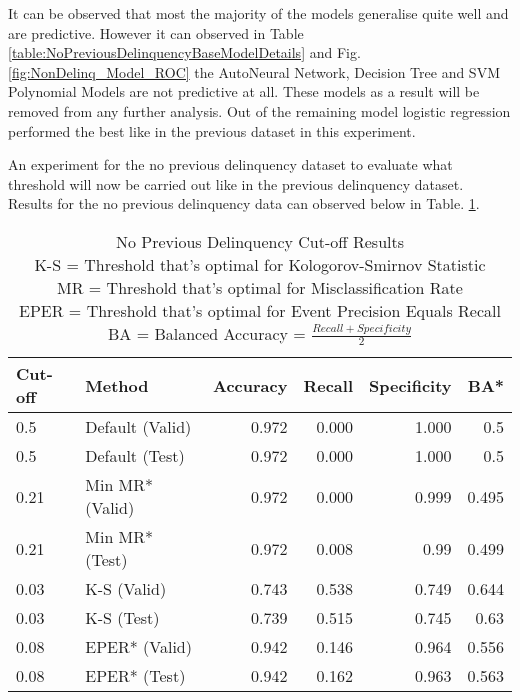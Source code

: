 It can be observed that most the majority of the models generalise quite well and are predictive. However it can observed in Table \ref{table:NoPreviousDelinquencyBaseModelDetails} and Fig. \ref{fig:NonDelinq_Model_ROC} the AutoNeural Network, Decision Tree and SVM Polynomial Models are not predictive at all. These models as a result will be removed from any further analysis. Out of the remaining model logistic regression performed the best like in the previous dataset in this experiment. 

An experiment for the no previous delinquency dataset to evaluate what threshold will now be carried out like in the previous delinquency dataset. Results for the no previous delinquency data can observed below in Table. \ref{table:NoDelinquencyModelCutoff}.

\begin{table}[H]
	\centering
	\small
		\begin{tabular}{|l|l|r|r|r|r|}
			\hline
			\textbf{Cut-off} & \textbf{Method} & \textbf{Accuracy} & \textbf{Recall} & \textbf{Specificity}  & \textbf{BA*}  \\ \hline
			0.5             & Default (Valid)  & 0.972             & 0.000           & 1.000                  & 0.5     \\
			0.5             & Default (Test)   & 0.972             & 0.000           & 1.000                  & 0.5     \\ \hline
			
			0.21            & Min MR* (Valid)   & 0.972             & 0.000           & 0.999                    & 0.495   \\
			0.21            & Min MR* (Test)    & \cellcolor{yellow!25}0.972             & 0.008                         & \cellcolor{yellow!25}0.99  & 0.499     \\ \hline
			
			0.03            & K-S (Valid)      & 0.743             & 0.538           & 0.749                 & 0.644     \\
			0.03            & K-S (Test)       & 0.739             & \cellcolor{yellow!25}0.515                          & 0.745  & \cellcolor{yellow!25}0.63     \\ \hline
			
			0.08            & EPER* (Valid)     & 0.942             & 0.146           & 0.964                   & 0.556   \\
			0.08            & EPER* (Test)      & 0.942             & 0.162           & 0.963                 & 0.563     \\ \hline
		\end{tabular}
	\caption{No Previous Delinquency Cut-off Results
			\\ K-S = Threshold that's optimal for Kologorov-Smirnov Statistic
			\\ MR = Threshold that's optimal for Misclassification Rate
			\\ EPER = Threshold that's optimal for Event Precision Equals Recall
			\\ BA = Balanced Accuracy = $\frac{Recall + Specificity }{2}$
			}
	\label{table:NoDelinquencyModelCutoff}
\end{table}

